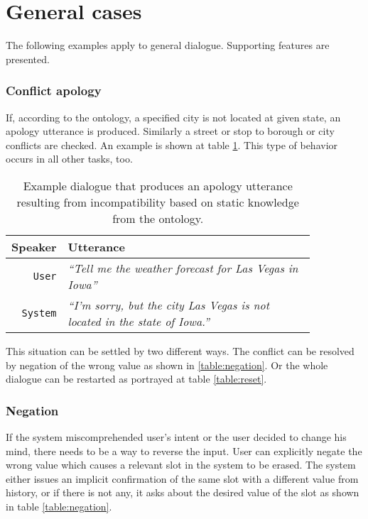 \section{General cases}

The following examples apply to general dialogue.
Supporting features are presented.

\subsubsection{Conflict apology}

If, according to the ontology, a specified city is not located at given state, an apology utterance is produced.
Similarly a street or stop to borough or city conflicts are checked.
An example is shown at table \ref{table:conflict}.
This type of behavior occurs in all other tasks, too.

\begin{table}[h]
\centering
\begin{tabular}{ | r | p{0.85\linewidth} | } \hline
	Speaker & Utterance \\ \hline
	\texttt{User} & \textit{``Tell me the weather forecast for Las Vegas in Iowa''} \\ \hline
	\texttt{System} & \textit{``I'm sorry, but the city Las Vegas is not located in the state of Iowa.''} \\ \hline
\end{tabular}
\caption[Conflict example of incompatible waypoints]{Example dialogue that produces an apology utterance resulting from incompatibility based on static knowledge from the ontology.}
\label{table:conflict}
\end{table}

This situation can be settled by two different ways.
The conflict can be resolved by negation of the wrong value as shown in \ref{table:negation}.
Or the whole dialogue can be restarted as portrayed at table \ref{table:reset}.

\subsubsection{Negation}

If the system miscomprehended user's intent or the user decided to change his mind, there needs to be a way to reverse the input.
User can explicitly negate the wrong value which causes a relevant slot in the system to be erased.
The system either issues an implicit confirmation of the same slot with a different value from history, or if there is not any, it asks about the desired value of the slot as shown in table \ref{table:negation}.

